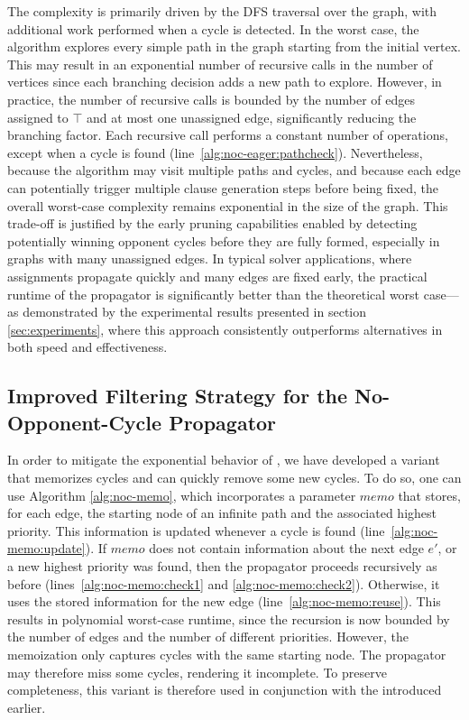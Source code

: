 \documentclass[a4paper,fleqn]{cas-sc}
\begin{document}
The complexity \noceager is primarily driven by the DFS traversal over the graph, with additional work performed when a cycle is detected. In the worst case, the algorithm explores every simple path in the graph starting from the initial vertex. This may result in an exponential number of recursive calls in the number of vertices since each branching decision adds a new path to explore. However, in practice, the number of recursive calls is bounded by the number of edges assigned to $\top$ and at most one unassigned edge, significantly reducing the branching factor. Each recursive call performs a constant number of operations, except when a cycle is found (line~\ref{alg:noc-eager:pathcheck}). Nevertheless, because the algorithm may visit multiple paths and cycles, and because each edge can potentially trigger multiple clause generation steps before being fixed, the overall worst-case complexity remains exponential in the size of the graph. This trade-off is justified by the early pruning capabilities enabled by detecting potentially winning opponent cycles before they are fully formed, especially in graphs with many unassigned edges. In typical solver applications, where assignments propagate quickly and many edges are fixed early, the practical runtime of the propagator is significantly better than the theoretical worst case—as demonstrated by the experimental results presented in section \ref{sec:experiments}, where this approach consistently outperforms alternatives in both speed and effectiveness.

\subsection{Improved Filtering Strategy for the No-Opponent-Cycle Propagator}

In order to mitigate the exponential behavior of \noceager, we have developed a variant that memorizes cycles and can quickly remove some new cycles. To do so, one can use Algorithm \ref{alg:noc-memo}, which incorporates a parameter $\textit{memo}$ that stores, for each edge, the starting node of an infinite path and the associated highest priority. This information is updated whenever a cycle is found (line~\ref{alg:noc-memo:update}). If $\textit{memo}$ does not contain information about the next edge $e'$, or a new highest priority was found, then the propagator proceeds recursively as before (lines~\ref{alg:noc-memo:check1} and \ref{alg:noc-memo:check2}). Otherwise, it uses the stored information for the new edge (line~\ref{alg:noc-memo:reuse}). 
This results in polynomial worst-case runtime, since the recursion is now bounded by the number of edges and the number of different priorities. However, the memoization only captures cycles with the same starting node. The propagator may therefore miss some cycles, rendering it incomplete. To preserve completeness, this variant is therefore used in conjunction with the \nocchecker introduced earlier.
\end{document}
